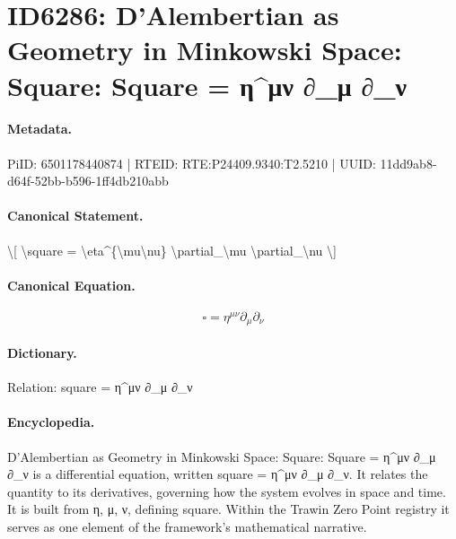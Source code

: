 \section*{ID6286: D’Alembertian as Geometry in Minkowski Space: Square: Square = η\textasciicircum{}μν ∂\_μ ∂\_ν}
\paragraph{Metadata.}
PiID: 6501178440874 | RTEID: RTE:P24409.9340:T2.5210 | UUID: 11dd9ab8-d64f-52bb-b596-1ff4db210abb

\paragraph{Canonical Statement.}
\textbackslash{}[ \textbackslash{}square = \textbackslash{}eta\textasciicircum{}\{\textbackslash{}mu\textbackslash{}nu\} \textbackslash{}partial\_\textbackslash{}mu \textbackslash{}partial\_\textbackslash{}nu \textbackslash{}]

\paragraph{Canonical Equation.}
\[
\square = \eta^{\mu\nu} \partial_\mu \partial_\nu
\]

\paragraph{Dictionary.}
Relation: square = η\textasciicircum{}μν ∂\_μ ∂\_ν

\paragraph{Encyclopedia.}
D’Alembertian as Geometry in Minkowski Space: Square: Square = η\textasciicircum{}μν ∂\_μ ∂\_ν is a differential equation, written square = η\textasciicircum{}μν ∂\_μ ∂\_ν. It relates the quantity to its derivatives, governing how the system evolves in space and time. It is built from η, μ, ν, defining square. Within the Trawin Zero Point registry it serves as one element of the framework's mathematical narrative.
